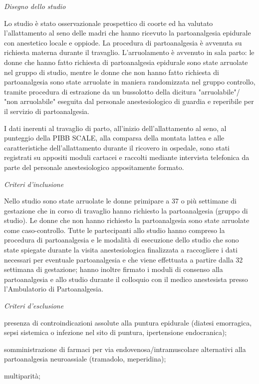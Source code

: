 \documentclass[]{article}
\begin{document}
\emph{Disegno dello studio}

Lo studio è stato osservazionale prospettico di coorte ed ha valutato
l'allattamento al seno delle madri che hanno ricevuto la partoanalgesia
epidurale con anestetico locale e oppiode. La procedura di
partoanalgesia è avvenuta su richiesta materna durante il travaglio.
L'arruolamento è avvenuto in sala parto: le donne che hanno fatto
richiesta di partoanalgesia epidurale sono state arruolate nel gruppo di
studio, mentre le donne che non hanno fatto richiesta di partoanalgesia
sono state arruolate in maniera randomizzata nel gruppo controllo,
tramite procedura di estrazione da un bussolotto della dicitura
"arruolabile"/ "non arruolabile" eseguita dal personale anestesiologico
di guardia e reperibile per il servizio di partoanalgesia.

I dati inerenti al travaglio di parto, all'inizio dell'allattamento al
seno, al punteggio della PIBB SCALE, alla comparsa della montata lattea
e alle caratteristiche dell'allattamento durante il ricovero in
ospedale, sono stati registrati su appositi moduli cartacei e raccolti
mediante intervista telefonica da parte del personale anestesiologico
appositamente formato.

\emph{Criteri d'inclusione }

Nello studio sono state arruolate le donne primipare a 37 o più
settimane di gestazione che in corso di travaglio hanno richiesto la
partoanalgesia (gruppo di studio). Le donne che non hanno richiesto la
partoanalgesia sono state arruolate come caso-controllo. Tutte le
partecipanti allo studio hanno compreso la procedura di partoanalgesia e
le modalità di esecuzione dello studio che sono state spiegate durante
la visita anestesiologica finalizzata a raccogliere i dati necessari per
eventuale partoanalgesia e che viene effettuata a partire dalla 32
settimana di gestazione; hanno inoltre firmato i moduli di consenso alla
partoanalgesia e allo studio durante il colloquio con il medico
anestesista presso l'Ambulatorio di Partoanalgesia.

\emph{Criteri d'esclusione }

presenza di controindicazioni assolute alla puntura epidurale (diatesi
emorragica, sepsi sistemica o infezione nel sito di puntura,
ipertensione endocranica);

somministrazione di farmaci per via endovenosa/intramuscolare
alternativi alla partoanalgesia neuroassiale (tramadolo, meperidina);

multiparità;
\end{document}
